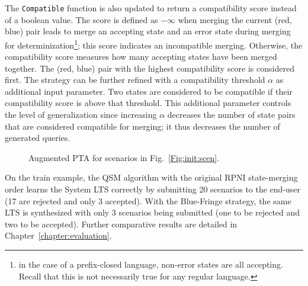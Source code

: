 The \texttt{Compatible} function is also updated to return a compatibility score instead of a boolean value. The score is defined as $-\infty$ when merging the current (red, blue) pair leads to merge an accepting state and an error state during merging for determinization\footnote{in the case of a prefix-closed language, non-error states are all accepting. Recall that this is not necessarily true for any regular language.}; this score indicates an incompatible merging. Otherwise, the compatibility score measures how many accepting states have been merged together. The (red, blue) pair with the highest compatibility score is considered first. The strategy can be further refined with a compatibility threshold $\alpha$ as additional input parameter. Two states are considered to be compatible if their compatibility score is above that threshold. This additional parameter controls the level of generalization since increasing $\alpha$ decreases the number of state pairs that are considered compatible for merging; it thus decreases the number of generated queries.

\begin{figure}\centering
{}
\caption{Augmented PTA for scenarios in Fig.~\ref{Fig:init:scen}\label{figure:augmented-pta}.}
\end{figure}

On the train example, the QSM algorithm with the original RPNI state-merging order learns the System LTS correctly by submitting 20 scenarios to the end-user (17 are rejected and only 3 accepted). With the Blue-Fringe strategy, the same LTS is synthesized with only 3 scenarios being submitted (one to be rejected and two to be accepted). Further comparative results are detailed in Chapter~\ref{chapter:evaluation}.
